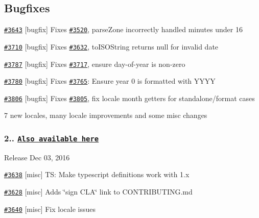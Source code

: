 \subsection*{Bugfixes}


\begin{DoxyItemize}
\item \href{https://github.com/moment/moment/pull/3643}{\tt \#3643} \mbox{[}bugfix\mbox{]} Fixes \href{https://github.com/moment/moment/issues/3520}{\tt \#3520}, parse\+Zone incorrectly handled minutes under 16
\item \href{https://github.com/moment/moment/pull/3710}{\tt \#3710} \mbox{[}bugfix\mbox{]} Fixes \href{https://github.com/moment/moment/issues/3632}{\tt \#3632}, to\+I\+S\+O\+String returns null for invalid date
\item \href{https://github.com/moment/moment/pull/3787}{\tt \#3787} \mbox{[}bugfix\mbox{]} Fixes \href{https://github.com/moment/moment/issues/3717}{\tt \#3717}, ensure day-\/of-\/year is non-\/zero
\item \href{https://github.com/moment/moment/pull/3780}{\tt \#3780} \mbox{[}bugfix\mbox{]} Fixes \href{https://github.com/moment/moment/issues/3765}{\tt \#3765}\+: Ensure year 0 is formatted with Y\+Y\+YY
\item \href{https://github.com/moment/moment/pull/3806}{\tt \#3806} \mbox{[}bugfix\mbox{]} Fixes \href{https://github.com/moment/moment/issues/3805}{\tt \#3805}, fix locale month getters for standalone/format cases
\end{DoxyItemize}

7 new locales, many locale improvements and some misc changes

\subsubsection*{2.. \href{https://gist.github.com/ichernev/f38280b2b29c4932914a6d3a4e50bfb2}{\tt Also available here}}


\begin{DoxyItemize}
\item Release Dec 03, 2016
\item \href{https://github.com/moment/moment/pull/3638}{\tt \#3638} \mbox{[}misc\mbox{]} TS\+: Make typescript definitions work with 1.\+x
\item \href{https://github.com/moment/moment/pull/3628}{\tt \#3628} \mbox{[}misc\mbox{]} Adds \char`\"{}sign C\+L\+A\char`\"{} link to {\ttfamily C\+O\+N\+T\+R\+I\+B\+U\+T\+I\+N\+G.\+md}
\item \href{https://github.com/moment/moment/pull/3640}{\tt \#3640} \mbox{[}misc\mbox{]} Fix locale issues
\end{DoxyItemize}

